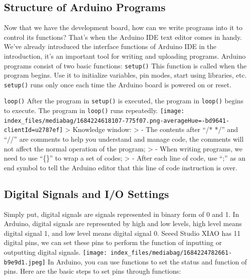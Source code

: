 \documentclass[
  letterpaper,
  DIV=11,
  numbers=noendperiod]{scrreprt}
\begin{document}
\hypertarget{structure-of-arduino-programs}{%
\subsection*{Structure of Arduino
Programs}\label{structure-of-arduino-programs}}

Now that we have the development board, how can we write programs into
it to control its functions? That's when the Arduino IDE text editor
comes in handy. We've already introduced the interface functions of
Arduino IDE in the introduction, it's an important tool for writing and
uploading programs. Arduino programs consist of two basic functions:
\texttt{setup()} This function is called when the program begins. Use it
to initialize variables, pin modes, start using libraries, etc.
\texttt{setup()} runs only once each time the Arduino board is powered
on or reset.

\texttt{loop()} After the program in \texttt{setup()} is executed, the
program in \texttt{loop()} begins to execute. The program in
\texttt{loop()} runs repeatedly.
\texttt{[image: index\_files/mediabag/1684224618107-775f07.png-averageHue=-bd9641-clientId=u2787ef]}
\textgreater{} Knowledge window: \textgreater{} - The contents after
``/* */'' and ``//'' are comments to help you understand and manage
code, the comments will not affect the normal operation of the program;
\textgreater{} - When writing programs, we need to use ``\{\}'' to wrap
a set of codes; \textgreater{} - After each line of code, use ``;'' as
an end symbol to tell the Arduino editor that this line of code
instruction is over.

\hypertarget{digital-signals-and-io-settings}{%
\subsection*{Digital Signals and I/O
Settings}\label{digital-signals-and-io-settings}}

Simply put, digital signals are signals represented in binary form of 0
and 1. In Arduino, digital signals are represented by high and low
levels, high level means digital signal 1, and low level means digital
signal 0. Seeed Studio XIAO has 11 digital pins, we can set these pins
to perform the function of inputting or outputting digital signals.
\texttt{[image: index\_files/mediabag/1684224782661-b9e9d1.jpeg]} In
Arduino, you can use functions to set the status and function of pins.
Here are the basic steps to set pins through functions:
\end{document}

